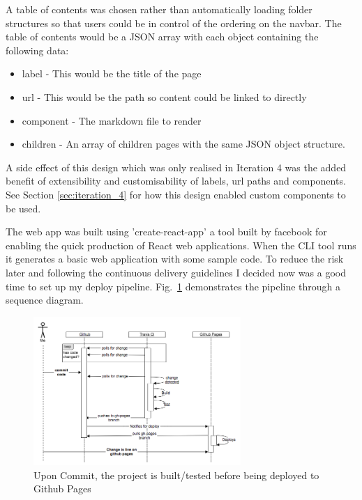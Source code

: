 A table of contents was
chosen rather than automatically loading folder structures so that users
could be in control of the ordering on the navbar. The table of contents
would be a JSON array with each object containing the following data:
\begin{itemize}
\item label - This would be the title of the page
\item url - This would be the path so content could be linked to directly
\item component - The markdown file to render
\item children - An array of children pages with the same JSON object structure.
\end{itemize}
A side effect of this design which was only realised in Iteration 4 was the
added benefit of extensibility and customisability of labels, url paths and
components. See Section \ref{sec:iteration_4} for how this design enabled custom
components to be used.

The web app was built using 'create-react-app' \citep{CreateReactApp} a tool
built by facebook for enabling the quick production of React web applications.
When the CLI tool runs it generates a basic web application with some sample
code. To reduce the risk later and following the continuous delivery
guidelines \citep{ContinuousDelivery} I decided now was a good time to set up
my deploy pipeline. Fig.~\ref{fig:cd_pipeline} demonstrates the pipeline
through a sequence diagram.

\begin{figure}[H]
\centering
\includegraphics[width=0.7\textwidth]{figures/deploy_pipeline}
\captionsetup{justification=centering}
\caption{Upon Commit, the project is built/tested before being deployed to
Github Pages
\label{fig:cd_pipeline}}
\end{figure}

